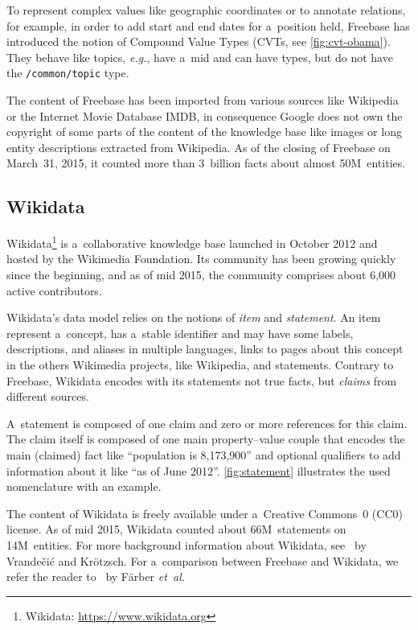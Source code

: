 \documentclass{acm_proc_article-sp}
\begin{document}
To represent complex values like geographic coordinates or to annotate relations,
for example, in order to add start and end dates for a~position held,
Freebase has introduced the notion of Compound Value Types (CVTs, see \autoref{fig:cvt-obama}).
They behave like topics, \emph{e.g.}, have a~mid and can have types,
but do not have the \texttt{/common/topic} type.

The content of Freebase has been imported from various sources like Wikipedia
or the Internet Movie Database IMDB,
in consequence Google does not own the copyright of some parts of the content of the knowledge base
like images or long entity descriptions extracted from Wikipedia.
As of the closing of Freebase on March~31, 2015,
it counted more than 3~billion facts about almost 50M~entities.

\subsection{Wikidata}

Wikidata\footnote{Wikidata: \url{https://www.wikidata.org}}
is a~collaborative knowledge base
launched in October 2012 and hosted by the Wikimedia Foundation.
Its community has been growing quickly since the beginning, and as of mid 2015,
the community comprises about 6,000 active contributors.

Wikidata's data model relies on the notions of \emph{item} and \emph{statement}.
An item represent a~concept, has a~stable identifier and may have some labels,
descriptions, and aliases in multiple languages, links to pages about this concept
in the others Wikimedia projects, like Wikipedia, and statements.
Contrary to Freebase, Wikidata encodes with its statements not true facts,
but \emph{claims} from different sources.

A~statement is composed of one claim and zero or more references for this claim.
The claim itself is composed of one main property--value couple that encodes
the main (claimed) fact like ``population is 8,173,900'' and optional qualifiers
to add information about it like ``as of June 2012''.
\autoref{fig:statement} illustrates the used nomenclature with an example.

The content of Wikidata is freely available under a~Creative Commons~0 (CC0) license.
As of mid 2015, Wikidata counted about 66M~statements on 14M~entities.
For more background information about Wikidata, see~\cite{vrandevcic2014wikidata}
by Vrandečić and Krötzsch.
For a~comparison between Freebase and Wikidata,
we refer the reader to~\cite{farbercomparative} by Färber \emph{et~al.}
\end{document}
